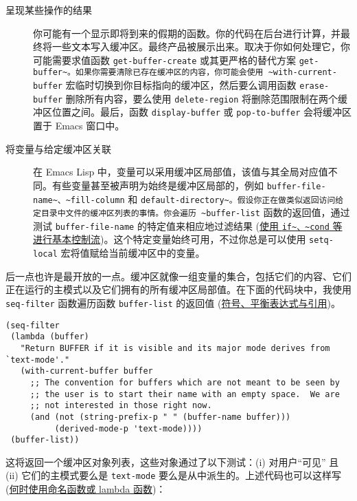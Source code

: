 \documentclass[11pt]{ctexart}
\begin{document}
\begin{description}
\item[{呈现某些操作的结果}] 你可能有一个显示即将到来的假期的函数。你的代码在后台进行计算，并最终将一些文本写入缓冲区。最终产品被展示出来。取决于你如何处理它，你可能需要求值函数 \texttt{get-buffer-create} 或其更严格的替代方案 \texttt{get-buffer\textasciitilde{}。如果你需要清除已存在缓冲区的内容，你可能会使用 \textasciitilde{}with-current-buffer} 宏临时切换到你目标指向的缓冲区，然后要么调用函数 \texttt{erase-buffer} 删除所有内容，要么使用 \texttt{delete-region} 将删除范围限制在两个缓冲区位置之间。最后，函数 \texttt{display-buffer} 或 \texttt{pop-to-buffer} 会将缓冲区置于 Emacs 窗口中。
\end{description}

\begin{description}
\item[{将变量与给定缓冲区关联}] 在 Emacs Lisp 中，变量可以采用缓冲区局部值，该值与其全局对应值不同。有些变量甚至被声明为始终是缓冲区局部的，例如 \texttt{buffer-file-name\textasciitilde{}、\textasciitilde{}fill-column} 和 \texttt{default-directory\textasciitilde{}。假设你正在做类似返回访问给定目录中文件的缓冲区列表的事情。你会遍历 \textasciitilde{}buffer-list} 函数的返回值，通过测试 \texttt{buffer-file-name} 的特定值来相应地过滤结果 (\hyperref[sec:org9ad3ad6]{使用 \texttt{if\textasciitilde{}、\textasciitilde{}cond} 等进行基本控制流})。这个特定变量始终可用，不过你总是可以使用 \texttt{setq-local} 宏将值赋给当前缓冲区中的变量。
\end{description}

后一点也许是最开放的一点。缓冲区就像一组变量的集合，包括它们的内容、它们正在运行的主模式以及它们拥有的所有缓冲区局部值。在下面的代码块中，我使用 \texttt{seq-filter} 函数遍历函数 \texttt{buffer-list} 的返回值 (\hyperref[sec:orgb51d706]{符号、平衡表达式与引用})。

\begin{verbatim}
(seq-filter
 (lambda (buffer)
   "Return BUFFER if it is visible and its major mode derives from `text-mode'."
   (with-current-buffer buffer
     ;; The convention for buffers which are not meant to be seen by
     ;; the user is to start their name with an empty space.  We are
     ;; not interested in those right now.
     (and (not (string-prefix-p " " (buffer-name buffer)))
          (derived-mode-p 'text-mode))))
 (buffer-list))
\end{verbatim}

这将返回一个缓冲区对象列表，这些对象通过了以下测试：(i) 对用户“可见” 且 (ii) 它们的主模式要么是 \texttt{text-mode} 要么是从中派生的。上述代码也可以这样写 (\hyperref[sec:orgf242639]{何时使用命名函数或 lambda 函数})：
\end{document}
